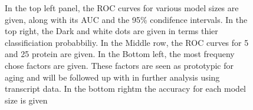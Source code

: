 \documentclass[a4paper,11pt,twoside]{book}
\begin{document}
	\begin{figure}[p]
		\vspace*{-2cm}
		\caption[Random Forest Classifier for Young and Old Mice]{In the top left panel, the ROC curves for various model sizes are given, along with its AUC and the 95\% condifence intervals. In the top right, the Dark and white dots are given in terms thier classificiation probabbiliy. In the Middle row, the ROC curves for 5 and 25 protein are given. In the Bottom left, the most frequeny chose factors are given. These factors are seen as prototypic for aging and will be followed up with in further analysis using transcript data. In the bottom rightm the accuracy for each model size is given}		
	\end{figure}
	
\end{document}
